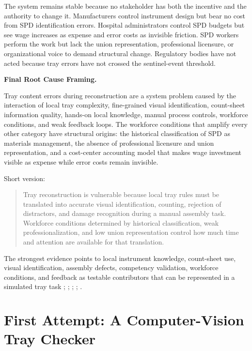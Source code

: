 \documentclass[10pt,a4paper]{article}
\begin{document}
The system remains stable because no stakeholder has both the incentive and the
authority to change it. Manufacturers control instrument design but bear no cost
from SPD identification errors. Hospital administrators control SPD budgets but
see wage increases as expense and error costs as invisible friction. SPD
workers perform the work but lack the union representation, professional
licensure, or organizational voice to demand structural change. Regulatory
bodies have not acted because tray errors have not crossed the sentinel-event
threshold.

\textbf{Final Root Cause Framing.}

Tray content errors during reconstruction are a system problem caused by the
interaction of local tray complexity, fine-grained visual identification,
count-sheet information quality, hands-on local knowledge, manual process
controls, workforce conditions, and weak feedback loops. The workforce
conditions that amplify every other category have structural origins: the
historical classification of SPD as materials management, the absence of
professional licensure and union representation, and a cost-center accounting
model that makes wage investment visible as expense while error costs remain
invisible.

Short version:
\begin{quote}
Tray reconstruction is vulnerable because local tray rules must be translated
into accurate visual identification, counting, rejection of distractors, and
damage recognition during a manual assembly task. Workforce conditions
determined by historical classification, weak professionalization, and low union
representation control how much time and attention are available for that
translation.
\end{quote}

The strongest evidence points to local instrument knowledge, count-sheet use,
visual identification, assembly defects, competency validation, workforce
conditions, and feedback as testable contributors that can be represented in a
simulated tray task
\cite{alfred-et-al-2021};
\cite{nichol-et-al-2024};
\cite{nadeau-2024};
\cite{ofstead-et-al-2023};
\cite{macola-et-al-2025}.




\section{First Attempt: A Computer-Vision Tray Checker}
\label{sec:first-attempt-a-computer-vision-tray-checker}
\end{document}

